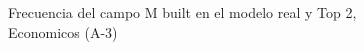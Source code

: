 \begin{figure}[H]
    \centering
    
    \caption{Frecuencia del campo M built en el modelo real y Top 2, Economicos (A-3)}
    \label{frecuency-M Built-top2}
\end{figure}